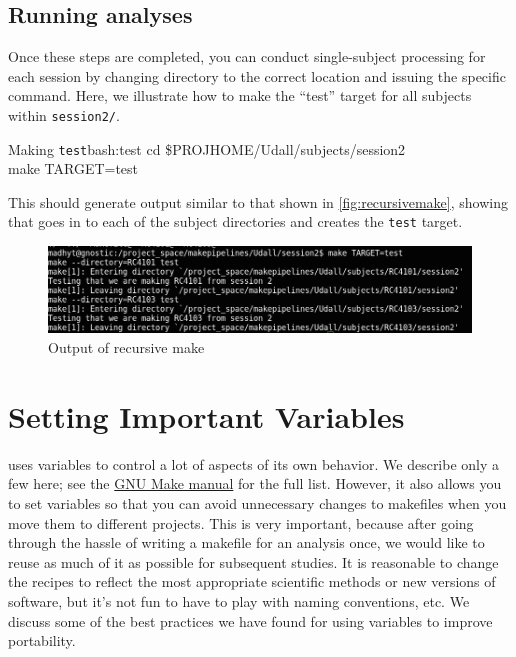 \subsection{Running analyses}
Once these steps are completed, you can conduct single-subject processing for each session by changing directory to the correct location and issuing the specific \maken{} command. Here, we illustrate how to make the ``test'' target for all subjects within \texttt{session2/}.

\begin{bash}{Making \texttt{test}}{bash:test}
	cd \$PROJHOME/Udall/subjects/session2 \\
	make TARGET=test
\end{bash}

This should generate output similar to that shown in \autoref{fig:recursivemake}, showing that \maken{} goes in to each of the subject directories and creates the \texttt{test} target.

\begin{figure}[h]
	\includegraphics[width=\textwidth]{images/make-output.png}
	\caption{Output of recursive make}
	\label{fig:recursivemake}
\end{figure}

\section{Setting Important Variables}

\maken{} uses variables to control a lot of aspects of its own behavior. We describe only a few here; see the \href{http://www.gnu.org/software/make/manual/}{GNU Make manual} for the full list. However, it also allows you to set variables so that you can avoid unnecessary changes to makefiles when you move them to different projects. This is very important, because after going through the hassle of writing a makefile for an analysis once, we would like to reuse as much of it as possible for subsequent studies. It is reasonable to change the recipes to reflect the most appropriate scientific methods or new versions of software, but it's not fun to have to play with naming conventions, etc. We discuss some of the best practices we have found for using variables to improve portability.

